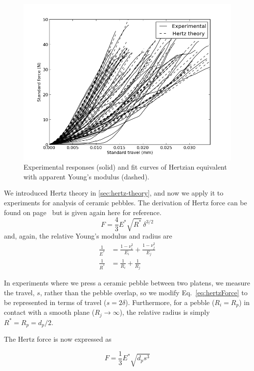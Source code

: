 \begin{figure}[t]
  \centering
  \includegraphics[width = 0.75 \textwidth]{chapters/figures/NFRI-exp_v_hertz}
  \caption{Experimental responses (solid) and fit curves of Hertzian equivalent with apparent Young's modulus (dashed).}\label{fig:hertz-exp}
\end{figure}






We introduced Hertz theory in \cref{sec:hertz-theory}, and now we apply it to experiments for analysis of ceramic pebbles. The derivation of Hertz force can be found on page~\pageref{eq:hertzForce} but is given again here for reference.
\begin{equation}
        F = \frac{4}{3}E^*\sqrt{R^*}\,\delta^{3/2}
\end{equation}
and, again, the relative Young's modulus and radius are
\begin{align*}
\frac{1}{E^*} & = \frac{1-\nu_i^2}{E_i} + \frac{1-\nu_j^2}{E_j} \\
\frac{1}{R^*} & = \frac{1}{R_i} + \frac{1}{R_j}
\end{align*}

In experiments where we press a ceramic pebble between two platens, we measure the travel, $s$, rather than the pebble overlap, so we modify Eq.~\ref{eq:hertzForce} to be represented in terms of travel ($s = 2\delta$). Furthermore, for a pebble ($R_i = R_p$) in contact with a smooth plane ($R_j \rightarrow \infty$), the relative radius is simply $R^* = R_p = d_p/2$.

The Hertz force is now expressed as

\begin{equation}\label{eq:contact-force}
        F = \frac{1}{3}E^*\sqrt{d_ps^3}
\end{equation}

